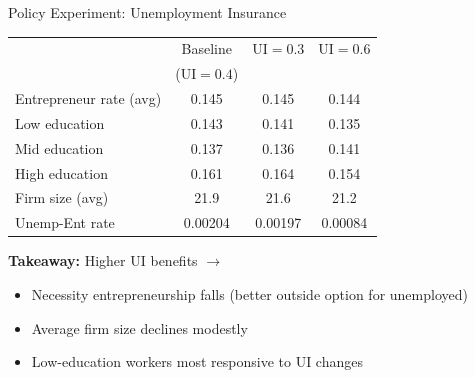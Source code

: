 \documentclass[aspectratio=169, 11pt]{beamer}
\begin{document}
\begin{frame}{Policy Experiment: Unemployment Insurance}
    \begin{table}
        \centering
        \small
        \begin{tabular}{lccc}
            \toprule
            & Baseline & UI$=0.3$ & UI$=0.6$ \\
            & (UI$=0.4$) & & \\
            \midrule
            Entrepreneur rate (avg) & 0.145 & 0.145 & 0.144 \\
            \quad Low education & 0.143 & 0.141 & 0.135 \\
            \quad Mid education & 0.137 & 0.136 & 0.141 \\
            \quad High education & 0.161 & 0.164 & 0.154 \\
            \midrule
            Firm size (avg) & 21.9 & 21.6 & 21.2 \\
            Unemp-Ent rate & 0.00204 & 0.00197 & 0.00084 \\
            \bottomrule
        \end{tabular}
    \end{table}

    \vspace{0.5em}

    \textbf{Takeaway:} Higher UI benefits $\rightarrow$
    \begin{itemize}
        \item Necessity entrepreneurship falls (better outside option for unemployed)
        \item Average firm size declines modestly
        \item Low-education workers most responsive to UI changes
    \end{itemize}
\end{frame}

\end{document}
